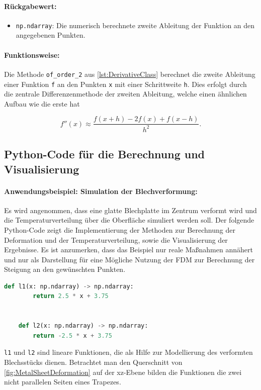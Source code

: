 \paragraph{Rückgabewert:}
\begin{itemize}
    \item \texttt{np.ndarray}: Die numerisch berechnete zweite Ableitung der Funktion an den angegebenen Punkten.
\end{itemize}

\paragraph{Funktionsweise:}
Die Methode \texttt{of\_order\_2} aus \ref{lst:DerivativeClass} berechnet die zweite Ableitung einer Funktion \texttt{f} an den Punkten \texttt{x} mit einer Schrittweite \texttt{h}. Dies erfolgt durch die zentrale Differenzenmethode der zweiten Ableitung, welche einen ähnlichen Aufbau wie die erste hat

\[f''(x) \approx \frac{f(x + h) - 2f(x) + f(x - h)}{h^2}\text{.}\]


\subsection{Python-Code für die Berechnung und Visualisierung}

\paragraph{Anwendungsbeispiel: Simulation der Blechverformung:}
Es wird angenommen, dass eine glatte Blechplatte im Zentrum verformt wird und die Temperaturverteilung über die Oberfläche simuliert werden soll. Der folgende Python-Code zeigt die Implementierung der Methoden zur Berechnung der Deformation und der Temperaturverteilung, sowie die Visualisierung der Ergebnisse. Es ist anzumerken, dass das Beispiel nur reale Maßnahmen annähert und nur als Darstellung für eine Mögliche Nutzung der FDM zur Berechnung der Steigung an den gewünschten Punkten.

\begin{lstlisting}[language=Python, caption={l1 und l2}, label={lst:linFunctions}]
    def l1(x: np.ndarray) -> np.ndarray:
        return 2.5 * x + 3.75


    def l2(x: np.ndarray) -> np.ndarray:
        return -2.5 * x + 3.75
\end{lstlisting}

\texttt{l1} und \texttt{l2} sind lineare Funktionen, die als Hilfe zur Modellierung des verformten Blechsstücks dienen. Betrachtet man den Querschnitt von \ref{fig:MetalSheetDeformation} auf der xz-Ebene bilden die Funktionen die zwei nicht parallelen Seiten eines Trapezes. 

